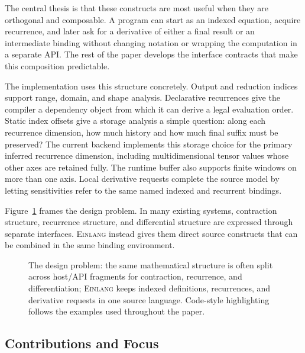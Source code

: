 \documentclass[sigplan,screen,nonacm]{acmart}
\newcommand{\einlang}{\textsc{Einlang}}
\begin{document}
The central thesis is that these constructs are most useful when they are orthogonal and composable. A program can start as an indexed equation, acquire recurrence, and later ask for a derivative of either a final result or an intermediate binding without changing notation or wrapping the computation in a separate API. The rest of the paper develops the interface contracts that make this composition predictable.

The implementation uses this structure concretely. Output and reduction indices support range, domain, and shape analysis. Declarative recurrences give the compiler a dependency object from which it can derive a legal evaluation order. Static index offsets give a storage analysis a simple question: along each recurrence dimension, how much history and how much final suffix must be preserved? The current backend implements this storage choice for the primary inferred recurrence dimension, including multidimensional tensor values whose other axes are retained fully. The runtime buffer also supports finite windows on more than one axis. Local derivative requests complete the source model by letting sensitivities refer to the same named indexed and recurrent bindings.

Figure~\ref{fig:fragmentation} frames the design problem. In many existing systems, contraction structure, recurrence structure, and differential structure are expressed through separate interfaces. \einlang{} instead gives them direct source constructs that can be combined in the same binding environment.

\begin{figure}[t]
\centering

\vspace{-0.35em}
\captionsetup{hypcap=false}
\caption{The design problem: the same mathematical structure is often split across host/API fragments for contraction, recurrence, and differentiation; \einlang{} keeps indexed definitions, recurrences, and derivative requests in one source language. Code-style highlighting follows the examples used throughout the paper.}
\label{fig:fragmentation}
\vspace{-0.4em}
\end{figure}

\subsection{Contributions and Focus}
\end{document}
